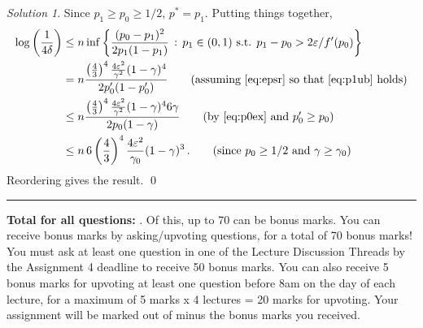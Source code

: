 \documentclass{article}
\DeclareMathOperator*{\1}{\mathbbm{1}}
\newcommand{\0}{\mathbf{0}}
\newcounter{DocPoints} %
\theoremstyle{definition}
\newtheorem{question}{Question}
\theoremstyle{remark}
\newtheorem*{solution*}{Solution}
\theoremstyle{theorem}
\begin{document}
\begin{solution*}
Since $p_1\ge p_0 \ge 1/2$, $p^* = p_1$. Putting things together,
\begin{align*}
\log\left(\frac{1}{4\delta}\right) 
& 
\le
n \inf \left\{ \frac{(p_0-p_1)^2}{2 p_1(1-p_1)} \,:\, p_1\in (0,1)
\text{ s.t. } p_1-p_0>2\varepsilon/f'(p_0)
\right\} \\
& = 
n \frac{\left(\frac43\right)^4 \frac{4 \varepsilon^2 }{\gamma^2}(1-\gamma)^4}{2 p_0'(1-p_0')}
\tag{assuming \cref{eq:epsr} so that \cref{eq:p1ub} holds}\\
& \le
n \frac{\left(\frac43\right)^4 \frac{4 \varepsilon^2 }{\gamma^2}(1-\gamma)^4 6\gamma}{2 p_0(1-\gamma)} 
\tag{by \cref{eq:p0ex} and $p_0'\ge p_0$}\\
& \le
n \,6\left(\frac43\right)^4 \frac{4 \varepsilon^2 }{\gamma_0}(1-\gamma)^3 \,.
\tag{since $p_0\ge 1/2$ and $\gamma\ge \gamma_0$}
\end{align*}
Reordering gives the result.
\qed\par\smallskip\hrule
\end{solution*}




\bigskip
\bigskip

\noindent
\textbf{
Total for all questions: }.
Of this, up to 70 can be bonus marks. You can receive bonus marks by asking/upvoting questions, for a total of 70 bonus marks!
You must ask at least one question in one of the Lecture Discussion Threads by the Assignment 4 deadline to receive 50 bonus marks.
You can also receive 5 bonus marks for upvoting at least one question before 8am on the day of each lecture, for a maximum of 5 marks x 4 lectures = 20 marks for upvoting.
Your assignment will be marked out of  minus the bonus marks you received.

\end{document}
